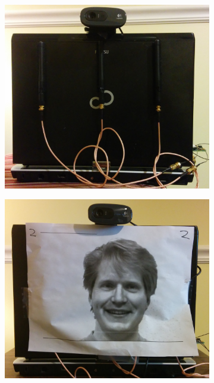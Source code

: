 \documentclass[12pt]{report}
\begin{document}
\begin{figure}[!htb]
    \begin{center}
        \caption{Testbed laptop shown with and without a printed face picture.}
        \label{figure: testbed-pictures}
        \begin{subfigure}[Testbed without face picture attached]{0.3\textwidth}
            \centerline{\includegraphics[scale=0.1]{../images/testbed-without-face.jpg}}
        \end{subfigure}
        \par\bigskip
        \begin{subfigure}[Testbed with face picture attached]{0.3\textwidth}
            \centerline{\includegraphics[scale=0.1]{../images/testbed-with-face.jpg}}
        \end{subfigure}
        \par\bigskip
    \end{center}
\end{figure}
\end{document}
